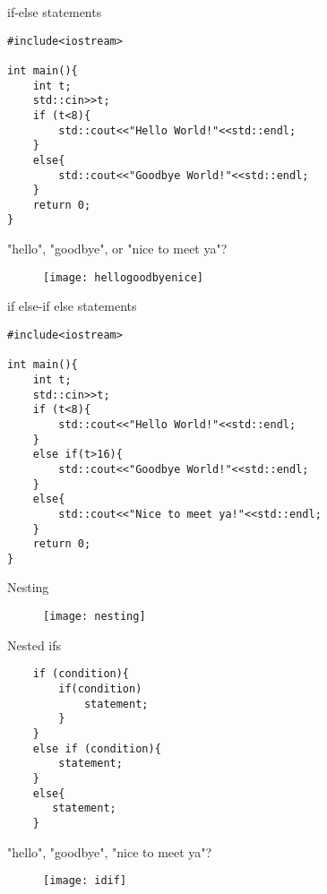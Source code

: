 \documentclass[xcolor={dvipsnames}]{beamer}
\begin{document}
\begin{frame}[fragile]{if-else statements}
\begin{verbatim}
#include<iostream>

int main(){
    int t;
    std::cin>>t;
    if (t<8){
        std::cout<<"Hello World!"<<std::endl;
    }
    else{
        std::cout<<"Goodbye World!"<<std::endl;
    }
    return 0;
}
\end{verbatim}
\end{frame}

\begin{frame}{"hello", "goodbye", or "nice to meet ya"?}
	\begin{center}	
	\begin{figure}
		\texttt{[image: hellogoodbyenice]}
	\end{figure}
	\end{center}
\end{frame}

\begin{frame}[fragile]{if else-if else statements}
\begin{verbatim}
#include<iostream>

int main(){
    int t;
    std::cin>>t;
    if (t<8){
        std::cout<<"Hello World!"<<std::endl;
    }
    else if(t>16){
        std::cout<<"Goodbye World!"<<std::endl;
    }
    else{
        std::cout<<"Nice to meet ya!"<<std::endl;
    }
    return 0;
}
\end{verbatim}
\end{frame}

\begin{frame}{Nesting}
\begin{center}	
	\begin{figure}
		\texttt{[image: nesting]}
	\end{figure}
	\end{center}
\end{frame}

\begin{frame}[fragile]{Nested ifs}
\begin{verbatim}
    if (condition){
        if(condition)
            statement;
        }
    }
    else if (condition){
        statement;
    }
    else{
       statement;
    }
\end{verbatim}
\end{frame}


\begin{frame}{"hello", "goodbye", "nice to meet ya"?}
	\begin{center}	
	\begin{figure}
		\texttt{[image: idif]}
	\end{figure}
	\end{center}
\end{frame}
\end{document}
